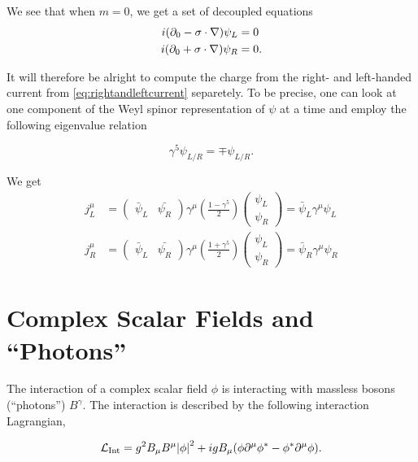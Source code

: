 \documentclass[11pt, a4paper]{amsart}
\begin{document}
We see that when $m=0$, we get a set of decoupled equations
\begin{align}
i(\partial_0 - \vb{\sigma} \cdot \nabla) \psi_L &= 0 \\
i(\partial_0 + \vb{\sigma} \cdot \nabla) \psi_R &= 0.
\end{align}

It will therefore be alright to compute the charge from the right- and left-handed current from \autoref{eq:rightandleftcurrent} separetely.  To be precise, one can look at one component of the Weyl spinor representation of $\psi$ at a time and employ the following eigenvalue relation

\begin{equation}
\gamma^5 \psi_{L/R} = \mp \psi_{L/R}.
\end{equation}

We get
\begin{align}
j_L^\mu &= \begin{pmatrix}
\bar{\psi}_L & \bar{\psi_R}
\end{pmatrix}\gamma^\mu \left(\frac{1 - \gamma^5}{2}\right) 
\begin{pmatrix}
\psi_L \\
\psi_R
\end{pmatrix} = \bar{\psi}_L \gamma^\mu \psi_L \\
j_R^\mu &= \begin{pmatrix}
\bar{\psi}_L & \bar{\psi_R}
\end{pmatrix}\gamma^\mu \left(\frac{1 + \gamma^5}{2}\right) 
\begin{pmatrix}
\psi_L \\
\psi_R
\end{pmatrix} = \bar{\psi}_R \gamma^\mu \psi_R
\end{align}


\section{Complex Scalar Fields and ``Photons''}

The interaction of a complex scalar field $\phi$ is interacting with massless bosons (``photons'') $B^\gamma$. The interaction is described by the following interaction Lagrangian,

\begin{equation}
\mathcal{L}_{\text{Int}} = g^2 B_\mu B^\mu \abs{\phi}^2 + ig B_\mu (\phi\partial^\mu\phi^* - \phi^* \partial^\mu \phi).
\end{equation}
\end{document}
